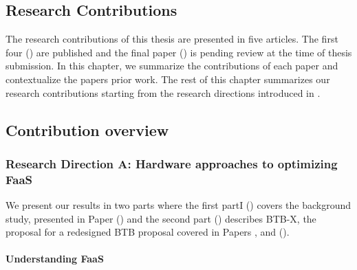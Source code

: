 \documentclass[../main.tex]{subfiles}
\begin{document}
\ifx\chapincluded\undefined
  \begin{refsection}
 \fi

 \chapter{Research Contributions}
\label{chap:rcontrib}

The research contributions of this thesis are presented in five
articles. The first four
()
are published and the final paper () is
pending review at the time of thesis submission. In this chapter, we
summarize the contributions of each paper and contextualize the papers
prior work. The rest of this chapter summarizes our research contributions starting from the research directions introduced in .


\section{Contribution overview}

\subsection{Research Direction A: Hardware approaches to optimizing FaaS}
We present our results in two parts where the first partI
() covers the
background study, presented in Paper  () and
the second part () describes BTB-X, the proposal for a
redesigned BTB proposal covered in Papers
,  and  ().

\subsubsection{Understanding FaaS}
\label{subsub:understanding}

\end{refsection}
\end{document}

